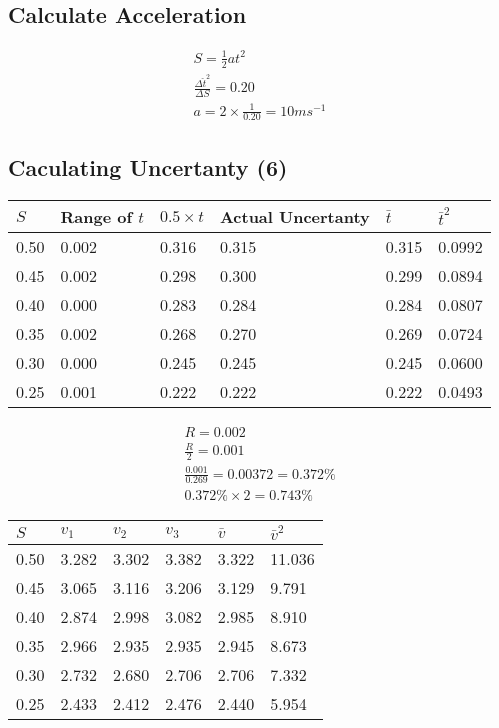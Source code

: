 \documentclass{article}
\begin{document}
\subsection{Calculate Acceleration}

\begin{gather}
	S = \frac{1}{2} at^2 \\
	\frac{\Delta \hat{t}^2}{\Delta{S}} = 0.20 \\
	a = 2 \times \frac{1}{0.20} = 10 \si{ms^{-1}}
\end{gather}

\subsection{Caculating Uncertanty (6)}
\begin{center}
    \begin{tabular}{l|l|l|l|l|l}
     $S$ & Range of $t$ & $0.5 \times t$ & Actual Uncertanty & $\bar{t}$ & ${\bar{t}}^2$\\ \hline
     0.50 & 0.002 & 0.316 & 0.315 & 0.315 & 0.0992 \\
     0.45 & 0.002 & 0.298 & 0.300 & 0.299 & 0.0894 \\
     0.40 & 0.000 & 0.283 & 0.284 & 0.284 & 0.0807 \\
     0.35 & 0.002 & 0.268 & 0.270 & 0.269 & 0.0724 \\
     0.30 & 0.000 & 0.245 & 0.245 & 0.245 & 0.0600 \\
     0.25 & 0.001 & 0.222 & 0.222 & 0.222 & 0.0493 \\
    \end{tabular}
\end{center}

\begin{gather}
	R = 0.002 \\
	\frac{R}{2} = 0.001 \\
    \frac{0.001}{0.269} = 0.00372 = 0.372\% \\
	0.372\% \times 2 = 0.743\%
\end{gather}

\begin{center}
    \begin{tabular}{l|l|l|l|l|l}
     $S$ & $v_1$ & $v_2$ & $v_3$ & $\bar{v}$ & ${\bar{v}}^2$\\ \hline
     0.50 & 3.282 & 3.302 & 3.382 & 3.322 & 11.036 \\
     0.45 & 3.065 & 3.116 & 3.206 & 3.129 & 9.791 \\
     0.40 & 2.874 & 2.998 & 3.082 & 2.985 & 8.910 \\
     0.35 & 2.966 & 2.935 & 2.935 & 2.945 & 8.673 \\
	 0.30 & 2.732 & 2.680 & 2.706 & 2.706 & 7.332 \\
     0.25 & 2.433 & 2.412 & 2.476 & 2.440 & 5.954 \\
    \end{tabular}
\end{center}
\end{document}
